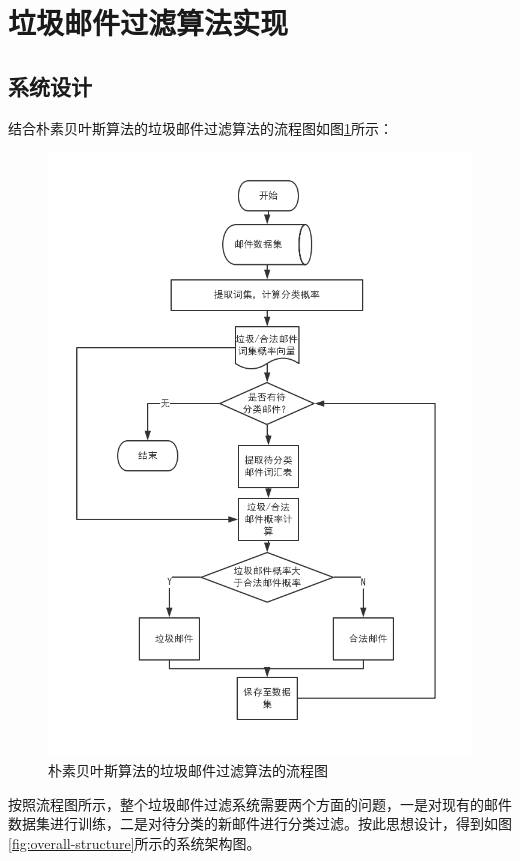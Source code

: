 \documentclass[UTF8,zihao=-4]{ctexart}
\begin{document}
\section{垃圾邮件过滤算法实现}
\subsection{系统设计}
	结合朴素贝叶斯算法的垃圾邮件过滤算法的流程图如图\ref{fig:overall-flowchart}所示：
	
	\begin{figure}[H]
		\centering
		\includegraphics[scale=0.5]{pictures/朴素贝叶斯算法的垃圾邮件过滤算法的流程图.png}
		\caption{朴素贝叶斯算法的垃圾邮件过滤算法的流程图}
		\label{fig:overall-flowchart}
	\end{figure}

	按照流程图所示，整个垃圾邮件过滤系统需要两个方面的问题，一是对现有的邮件数据集进行训练，二是对待分类的新邮件进行分类过滤。按此思想设计，得到如图\ref{fig:overall-structure}所示的系统架构图。
	
\end{document}
